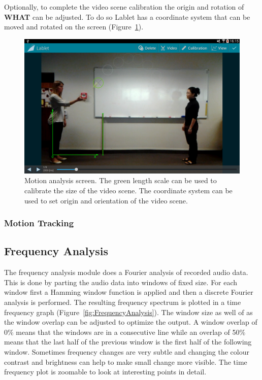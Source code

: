 \documentclass{sigchi}
\begin{document}
Optionally, to complete the video scene calibration the origin and
rotation of {\bf WHAT} can be adjusted.  To do so Lablet has a coordinate system
that can be moved and rotated on the screen
(Figure~\ref{fig:MotionAnalysis}).


\begin{figure}
  \centering
  \includegraphics[width=.99\columnwidth]{MotionAnalysis}
  \caption{Motion analysis screen.  The green length scale can be used
    to calibrate the size of the video scene.  The coordinate system
    can be used to set origin and orientation of the video
    scene.\label{fig:MotionAnalysis} }
\end{figure}

\subsubsection{Motion Tracking}


\subsection{Frequency Analysis}
The frequency analysis module does a Fourier analysis of recorded
audio data.  This is done by parting the audio data into windows of
fixed size.  For each window first a Hamming window function is
applied and then a discrete Fourier analysis is performed.  The
resulting frequency spectrum is plotted in a time frequency graph
(Figure~\ref{fig:FrequencyAnalysis}).  The window size as well of as
the window overlap can be adjusted to optimize the output.  A window
overlap of 0\% means that the windows are in a consecutive line while
an overlap of 50\% means that the last half of the previous window is
the first half of the following window.  Sometimes frequency changes
are very subtle and changing the colour contrast and brightness can
help to make small change more visible.  The time frequency plot is
zoomable to look at interesting points in detail.
\end{document}
